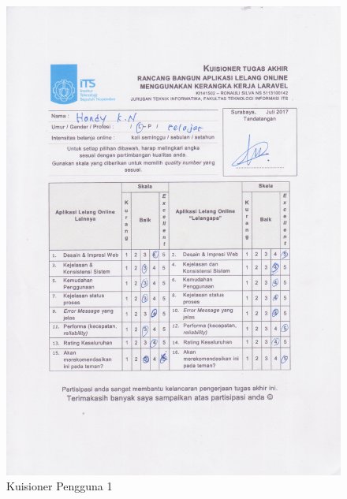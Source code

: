 \begin{figure}[H]
	\centering
	\includegraphics[width=\textwidth]{images/bab5/ujipengguna/7.jpg}
	\caption{Kuisioner Pengguna 1}
	\label{quest-7}
\end{figure}
